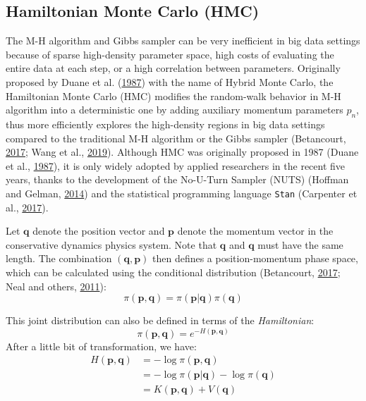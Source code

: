 \documentclass[12pt]{book}
\numberwithin{equation}{chapter}
\begin{document}
\hypertarget{hamiltonian-monte-carlo-hmc}{%
\subsection{Hamiltonian Monte Carlo (HMC)}\label{hamiltonian-monte-carlo-hmc}}

The M-H algorithm and Gibbs sampler can be very inefficient in big data settings because of sparse high-density parameter space, high costs of evaluating the entire data at each step, or a high correlation between parameters. Originally proposed by Duane et al. (\protect\hyperlink{ref-duane1987hybrid}{1987}) with the name of Hybrid Monte Carlo, the Hamiltonian Monte Carlo (HMC) modifies the random-walk behavior in M-H algorithm into a deterministic one by adding auxiliary momentum parameters \(p_n\), thus more efficiently explores the high-density regions in big data settings compared to the traditional M-H algorithm or the Gibbs sampler (Betancourt, \protect\hyperlink{ref-betancourt2017conceptual}{2017}; Wang et al., \protect\hyperlink{ref-wang2019hamiltonian}{2019}). Although HMC was originally proposed in 1987 (Duane et al., \protect\hyperlink{ref-duane1987hybrid}{1987}), it is only widely adopted by applied researchers in the recent five years, thanks to the development of the No-U-Turn Sampler (NUTS) (Hoffman and Gelman, \protect\hyperlink{ref-hoffman2014no}{2014}) and the statistical programming language \texttt{Stan} (Carpenter et al., \protect\hyperlink{ref-carpenter2017stan}{2017}).

Let \(\boldsymbol{q}\) denote the position vector and \(\boldsymbol{p}\) denote the momentum vector in the conservative dynamics physics system. Note that \(\boldsymbol{q}\) and \(\boldsymbol{q}\) must have the same length. The combination \((\boldsymbol{q}, \boldsymbol{p})\) then defines a position-momentum phase space, which can be calculated using the conditional distribution (Betancourt, \protect\hyperlink{ref-betancourt2017conceptual}{2017}; Neal and others, \protect\hyperlink{ref-neal2011mcmc}{2011}):
\[\pi(\boldsymbol{p}, \boldsymbol{q}) = \pi(\boldsymbol{p}|\boldsymbol{q})\pi(\boldsymbol{q})\]

This joint distribution can also be defined in terms of the \emph{Hamiltonian}:
\[\pi(\boldsymbol{p}, \boldsymbol{q}) = e^{-H(\boldsymbol{p}, \boldsymbol{q})}\]
After a little bit of transformation, we have:
\begin{equation}
\begin{aligned}
H(\boldsymbol{p}, \boldsymbol{q}) &= -\log \pi(\boldsymbol{p}, \boldsymbol{q})\\
&= -\log\pi(\boldsymbol{p}|\boldsymbol{q}) - \log\pi(\boldsymbol{q})\\
&= K(\boldsymbol{p}, \boldsymbol{q}) + V(\boldsymbol{q})
\label{eq:hamiltonian}
\end{aligned}
\end{equation}
\end{document}
